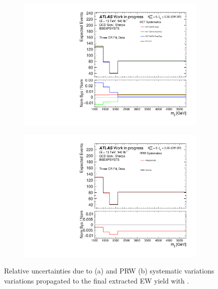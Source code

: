 \begin{figure}[t]
\begin{subfigure}[b]{0.48\textwidth}
    \centering
    \includegraphics[width=\textwidth]{plots/diffx/expsysts/groups/mjj_QCD_Sh2211_BSEXPSYSTS_3cr_MET_0p01sigma_allvariations.pdf}
    \caption{}
\end{subfigure}
\begin{subfigure}[b]{0.48\textwidth}
    \centering
    \includegraphics[width=\textwidth]{plots/diffx/expsysts/groups/mjj_QCD_Sh2211_BSEXPSYSTS_3cr_PRW_0p01sigma_allvariations.pdf}
    \caption{}
\end{subfigure}
\caption{Relative uncertainties due to \met (a) and PRW (b) systematic variations variations propagated to the final extracted EW yield with \mjj.}
\label{fig:vbswy:otherexpvariationsmjj}
\end{figure}

